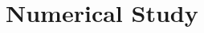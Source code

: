\documentclass[mnsc,dblanonrev]{informs4}
\begin{document}

%

\section{Numerical Study}
\label{sec:numerics}

%
%
\end{document}
